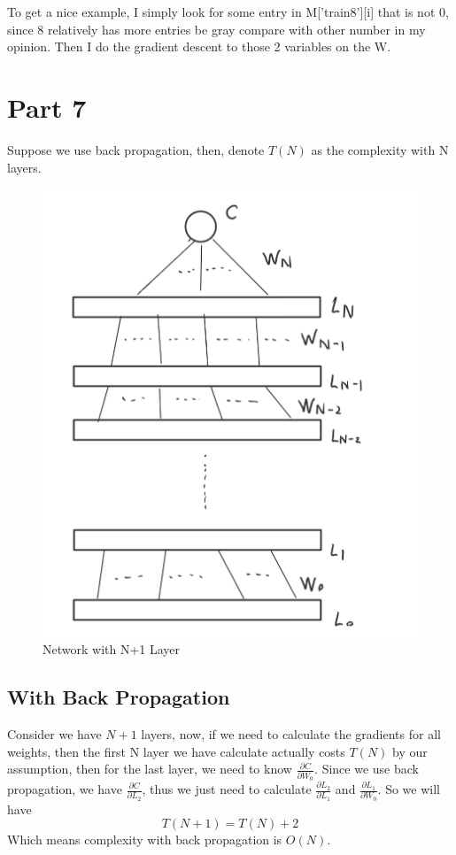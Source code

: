 \documentclass[12pt]{article}
\begin{document}
To get a nice example, I simply look for some entry in M['train8'][i] that is not 0, since 8 relatively has more entries be gray compare with other number in my opinion. Then I do the gradient descent to those 2 variables on the W.

\section*{Part 7}
Suppose we use back propagation, then, denote $T(N)$ as the complexity with N layers.
\begin{figure}[h]
    \centering
    \includegraphics[scale=0.2]{report/part7_layer.jpg}
    \caption{Network with N+1 Layer}
\end{figure}
\subsection*{With Back Propagation}
Consider we have $N+1$ layers, now, if we need to calculate the gradients for all weights, then the first N layer we have calculate actually costs $T(N)$ by our assumption, then for the last layer, we need to know $\frac{\partial C}{\partial W_0}$. Since we use back propagation, we have $\frac{\partial C}{\partial L_2}$, thus we just need to calculate $\frac{\partial L_2}{\partial L_1}$ and $\frac{\partial L_1}{\partial W_0}$. So we will have
\[
    T(N+1) = T(N) + 2
\]
Which means complexity with back propagation is $O(N)$.
\end{document}
